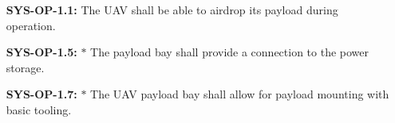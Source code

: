 \begin{enumerate}[leftmargin =4.5cm, align=parleft, labelwidth=10em]
    \item[\textbf{SYS-OP-1.1:}] The UAV shall be able to airdrop its payload during operation.
    \item[\textbf{SYS-OP-1.5:} $\ast$ ] The payload bay shall provide a connection to the power storage.
    \item[\textbf{SYS-OP-1.7:} $\ast$ ] The UAV payload bay shall allow for payload mounting with basic tooling.
    

\end{enumerate}
